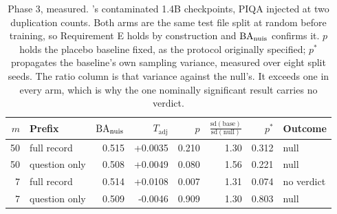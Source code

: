 \begin{table}[t]
\small
\centering
\setlength{\tabcolsep}{4pt}
\begin{tabular}{@{}rlrrrrrl@{}}
\toprule
$m$ & Prefix & $\mathrm{BA}_{\mathrm{nuis}}$ & $T_{\mathrm{adj}}$ & $p$ & $\frac{\mathrm{sd(base)}}{\mathrm{sd(null)}}$ & $p^{*}$ & Outcome \\
\midrule
50 & full record & 0.515 & +0.0035 & 0.210 & 1.30 & 0.312 & null \\
50 & question only & 0.508 & +0.0049 & 0.080 & 1.56 & 0.221 & null \\
7 & full record & 0.514 & +0.0108 & 0.007 & 1.31 & 0.074 & no verdict \\
7 & question only & 0.509 & -0.0046 & 0.909 & 1.30 & 0.803 & null \\
\bottomrule
\end{tabular}
\caption{Phase 3, measured. \citeauthor{oren2024proving}'s contaminated 1.4B checkpoints, PIQA injected at two duplication counts. Both arms are the same test file split at random before training, so Requirement E holds by construction and $\mathrm{BA}_{\mathrm{nuis}}$ confirms it. $p$ holds the placebo baseline fixed, as the protocol originally specified; $p^{*}$ propagates the baseline's own sampling variance, measured over eight split seeds. The ratio column is that variance against the null's. It exceeds one in every arm, which is why the one nominally significant result carries no verdict.}
\label{tab:phase3}
\end{table}
